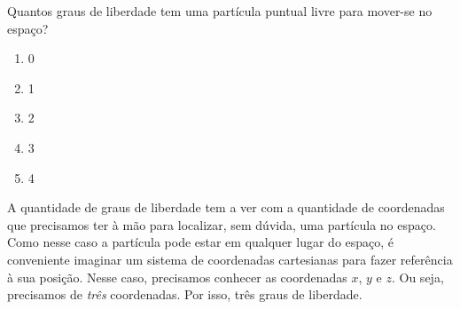 \begin{question}
    Quantos graus de liberdade tem uma partícula puntual livre para mover-se no espaço?
    \begin{enumerate}
      \item 0
      \item 1
      \item 2
      \item 3 \rightanswer
      \item 4
    \end{enumerate}

    \begin{solution}
      A quantidade de graus de liberdade tem a ver com a quantidade de coordenadas que precisamos ter à mão para localizar, sem dúvida, uma partícula no espaço.
      Como nesse caso a partícula pode estar em qualquer lugar do espaço, é conveniente imaginar um sistema de coordenadas cartesianas para fazer referência à sua posição.
      Nesse caso, precisamos conhecer as coordenadas $x$, $y$ e $z$.
      Ou seja, precisamos de \emph{três} coordenadas.
      Por isso, três graus de liberdade.
    \end{solution}
\end{question}